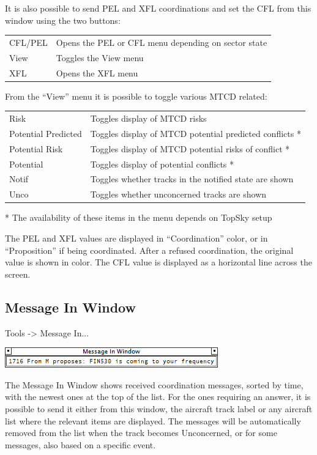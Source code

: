 \documentclass[11pt,a4paper]{memoir}
\newcommand{\colorref}[1]{\textit{\hyperref[#1]{\StrDel{#1}{color:}}}}
\begin{document}
It is also possible to send PEL and XFL coordinations and set the CFL from this window using the two buttons:

\begin{tabular}{l l}
    CFL/PEL     & Opens the PEL or CFL menu depending on sector state\\
    View        & Toggles the View menu\\
    XFL         & Opens the XFL menu\\
\end{tabular}

From the “View” menu it is possible to toggle various MTCD related:

\begin{tabular}{l l}
    Risk                    & Toggles display of MTCD risks\\
    Potential Predicted     & Toggles display of MTCD potential predicted conflicts *\\
    Potential Risk          & Toggles display of MTCD potential risks of conflict *\\
    Potential               & Toggles display of potential conflicts *\\
    Notif                   & Toggles whether tracks in the notified state are shown\\
    Unco                    & Toggles whether unconcerned tracks are shown\\
\end{tabular}

* The availability of these items in the menu depends on TopSky setup

The PEL and XFL values are displayed in “Coordination” color, or in “Proposition” if being coordinated. After a refused coordination, the original value is shown in \colorref{color:Warning} color. The CFL value is displayed as a horizontal line across the screen.

\subsection{Message In Window}
\label{win:miw}

\textit{} Tools -> Message In...

\includegraphics{img/miw.png}

The Message In Window shows received coordination messages, sorted by time, with the newest ones at the top of the list. For the ones requiring an answer, it is possible to send it either from this window, the aircraft track label or any aircraft list where the relevant items are displayed. The messages will be automatically removed from the list when the track becomes Unconcerned, or for some messages, also based on a specific event.
\end{document}
